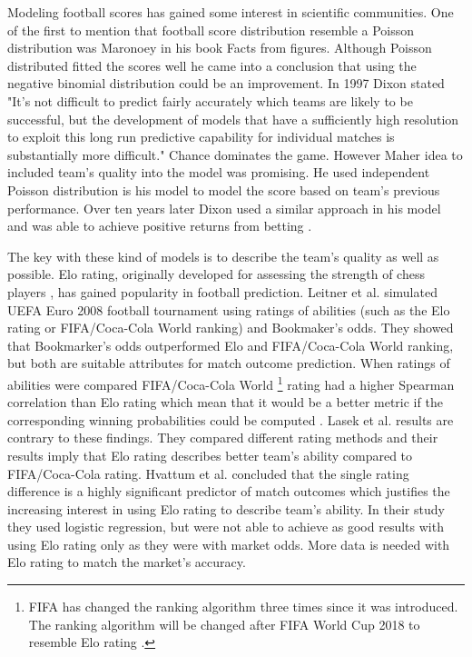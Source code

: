 Modeling football scores has gained some interest in scientific communities. One of the first to mention that football score distribution resemble a Poisson distribution was Maronoey \cite{moroney1962facts} in his book Facts from figures. Although Poisson distributed fitted the scores well he came into a conclusion that using the negative binomial distribution could be an improvement.
In 1997 Dixon stated \cite{dixon1997} "It's not difficult to predict fairly accurately which teams are likely to be successful, but the development of models that have a sufficiently high resolution to exploit this long run predictive capability for individual matches is substantially more difficult." Chance dominates the game. However Maher \cite{maher1982modelling} idea to  included team's quality into the model was promising. He used independent Poisson distribution is his model to model the score based on team's previous performance. Over ten years later Dixon used a similar approach in his model and was able to achieve positive returns from betting \cite{dixon1997}.

The key with these kind of models is to describe the team's quality as well as possible. Elo rating, originally developed for assessing the strength of chess players \cite{elo1978rating}, has gained popularity in football prediction. Leitner et al. \cite{leitner2010forecasting} simulated UEFA Euro 2008 football tournament using ratings of abilities (such as the Elo rating or FIFA/Coca-Cola World ranking) and Bookmaker's odds. They showed that Bookmarker's odds outperformed Elo and FIFA/Coca-Cola World ranking, but both are suitable attributes for match outcome prediction. When ratings of abilities were compared FIFA/Coca-Cola World \footnote{FIFA has changed the ranking algorithm three times since it was introduced. The ranking algorithm will be changed after FIFA World Cup 2018 to resemble Elo rating \cite{wiki:fifarating}.} rating had a higher Spearman correlation than Elo rating which mean that it would be a better metric if the corresponding winning probabilities could be computed \cite{leitner2010forecasting}. Lasek et al. \cite{lasek2013predictive} results are contrary to these findings. They compared different rating methods and their results imply that Elo rating describes better team's ability compared to FIFA/Coca-Cola rating. Hvattum et al. \cite{hvattum2010using} concluded that the single rating difference is a highly significant predictor of match outcomes which justifies the increasing interest in using Elo rating to describe team's ability. In their study they used logistic regression, but were not able to achieve as good results with using Elo rating only as they were with market odds. More data is needed with Elo rating to match the market's accuracy.

